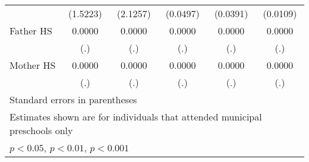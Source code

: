 \begin{table}[htbp]
\begin{tabular}{l*{5}{c}}
            &    (1.5223)         &    (2.1257)         &    (0.0497)         &    (0.0391)         &    (0.0109)         \\
\addlinespace
Father HS   &      0.0000         &      0.0000         &      0.0000         &      0.0000         &      0.0000         \\
            &         (.)         &         (.)         &         (.)         &         (.)         &         (.)         \\
\addlinespace
Mother HS   &      0.0000         &      0.0000         &      0.0000         &      0.0000         &      0.0000         \\
            &         (.)         &         (.)         &         (.)         &         (.)         &         (.)         \\
\bottomrule
\multicolumn{6}{l}{\footnotesize Standard errors in parentheses}\\
\multicolumn{6}{l}{\footnotesize Estimates shown are for individuals that attended municipal preschools only}\\
\multicolumn{6}{l}{\footnotesize \sym{*} \(p<0.05\), \sym{**} \(p<0.01\), \sym{***} \(p<0.001\)}\\
\end{tabular}
\end{table}
